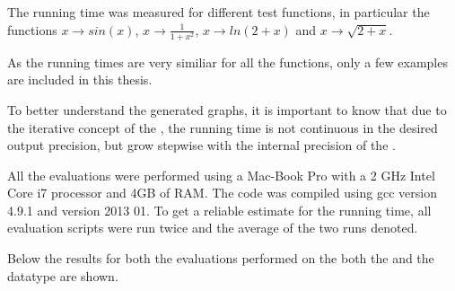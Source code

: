     The running time was measured for different test functions, 
 		in particular the functions $x \to sin(x)$, $x \to \frac{1}{1+x^2}$, $x \to ln(2+x)$ and $x \to \sqrt{2+x}$. 

    As the running times are very similiar for all the functions, only a few examples are included in this thesis.

 		To better understand the generated graphs, it is important to know that due to the iterative concept of the \irram,
    the running time is not continuous in the desired output precision, but grow stepwise with the internal precision of the \irram.
    
    All the evaluations were performed using a Mac-Book Pro with a 2 GHz Intel Core i7 processor and 4GB of RAM.
    The code was compiled using gcc version 4.9.1 and \irram version 2013 01.
    To get a reliable estimate for the running time, all evaluation scripts were run twice and 
    the average of the two runs denoted.

    Below the results for both the evaluations performed on the both the \baana and the \anarect datatype are shown. 
		\subsection{\baana}

